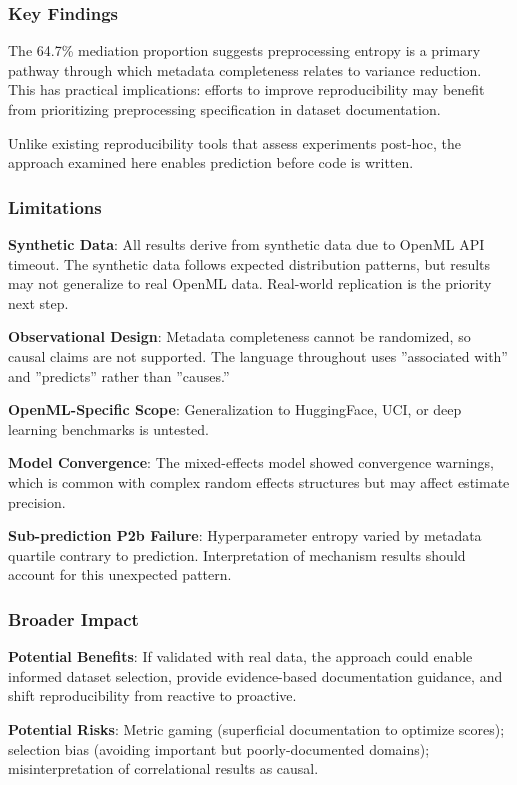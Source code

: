 
\subsubsection{Key Findings}

The 64.7\% mediation proportion suggests preprocessing entropy is a primary pathway through which metadata completeness relates to variance reduction. This has practical implications: efforts to improve reproducibility may benefit from prioritizing preprocessing specification in dataset documentation.

Unlike existing reproducibility tools that assess experiments post-hoc, the approach examined here enables prediction before code is written.

\subsubsection{Limitations}

\textbf{Synthetic Data}: All results derive from synthetic data due to OpenML API timeout. The synthetic data follows expected distribution patterns, but results may not generalize to real OpenML data. Real-world replication is the priority next step.

\textbf{Observational Design}: Metadata completeness cannot be randomized, so causal claims are not supported. The language throughout uses ''associated with'' and ''predicts'' rather than ''causes.''

\textbf{OpenML-Specific Scope}: Generalization to HuggingFace, UCI, or deep learning benchmarks is untested.

\textbf{Model Convergence}: The mixed-effects model showed convergence warnings, which is common with complex random effects structures but may affect estimate precision.

\textbf{Sub-prediction P2b Failure}: Hyperparameter entropy varied by metadata quartile contrary to prediction. Interpretation of mechanism results should account for this unexpected pattern.

\subsubsection{Broader Impact}

\textbf{Potential Benefits}: If validated with real data, the approach could enable informed dataset selection, provide evidence-based documentation guidance, and shift reproducibility from reactive to proactive.

\textbf{Potential Risks}: Metric gaming (superficial documentation to optimize scores); selection bias (avoiding important but poorly-documented domains); misinterpretation of correlational results as causal.

